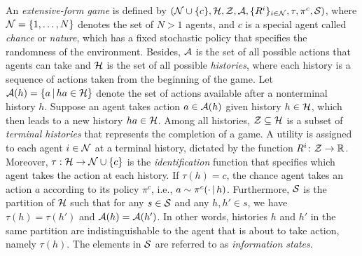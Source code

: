 \begin{definition} \label{def:ext_form_game}
	An \emph{extensive-form game}  is  defined by   $(\mathcal{N}\cup \{c\},\mathcal{H},\mathcal{Z},\mathcal{A}, \{ R^i\}_{i \in \mathcal{N}},\tau,\pi^c,{\mathcal{S}})$, where $\mathcal{N} = \{ 1, \ldots, N \}$ denotes the set of $N > 1 $ agents, and $c$ is a special agent called \emph{chance} or \emph{nature},  which has a fixed stochastic policy that specifies the randomness of the environment.  Besides,  $\mathcal{A}$ is the set of all possible actions that agents can take and $\mathcal{H}$ is the set of all possible \emph{histories}, where each history is  a sequence of actions taken  from the beginning of the game. 
	Let     $\mathcal{A}(h)=\{a{\,|\,} ha \in\mathcal{H}\}$ denote  the set of  actions available after a nonterminal history $h $. 
	Suppose an agent takes action $a \in \mathcal{A}(h)$ given  history $h \in \mathcal{H}$, which then leads to a  new history $ha \in \mathcal{H}$. 
	Among all histories, $\mathcal{Z}\subseteq \mathcal{H}$ is a subset of \emph{terminal histories} that represents the completion of a game. 
A utility is assigned to each agent $i \in \mathcal{N}$ at a terminal history, dictated by the function 
	$R^i \colon  \mathcal{Z}\rightarrow \mathbb{R}$. 
	 Moreover, $\tau :\mathcal{H}\to\mathcal{N}\cup \{c\}$ is the \emph{identification} function that specifies which agent takes the action at each history. 
	If $\tau(h)=c$, the chance agent takes an  action $a$  according to its policy $\pi^c$, i.e., $a \sim \pi^c(\cdot{\,|\,} h)$. Furthermore, ${\mathcal{S}}$ is the partition of $\mathcal{H}$ such that  
	 for any $s \in {\mathcal{S}}$ and any $h, h' \in s $,  we have  $\tau(h) = \tau(h') $ and  $\mathcal{A} (h) = \mathcal{A} (h')$. In other words, histories $h$ and $h'$ in the same partition are indistinguishable to the agent that is about to take action, namely $\tau(h)$. The elements in ${\mathcal{S}}$ are referred to as 
	 \emph{information states}.
	\end{definition}

